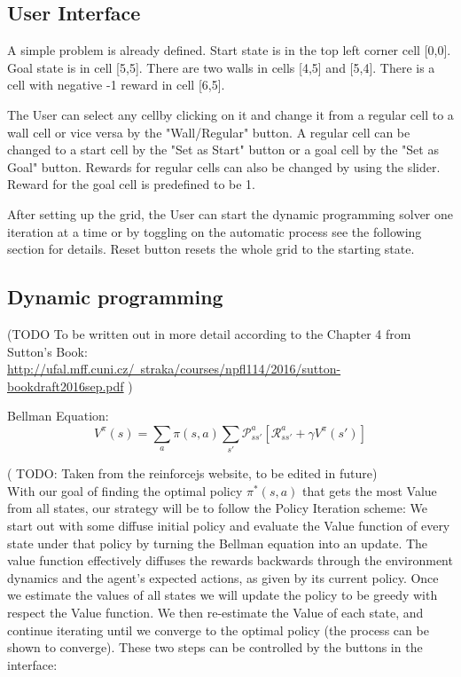 \documentclass{article}
\begin{document}
\subsection{User Interface}
A simple problem is already defined. Start state is in the top left corner cell [0,0]. Goal state is in cell [5,5]. There are two walls in cells [4,5] and [5,4]. There is a cell with negative -1 reward in cell [6,5].

The User can select any cellby clicking on it and change it from a regular cell to a wall cell or vice versa by the "Wall/Regular" button. A regular cell can be changed to a start cell by the "Set as Start" button or a goal cell by the "Set as Goal" button. Rewards for regular cells can also be changed by using the slider. Reward for the goal cell is predefined to be 1.

After setting up the grid, the User can start the dynamic programming solver one iteration at a time or by toggling on the automatic process see the following section for details. Reset button resets the whole grid to the starting state.

\subsection{Dynamic programming}
(TODO To be written out in more detail according to the Chapter 4 from Sutton's Book:\\ \href{url}{http://ufal.mff.cuni.cz/~straka/courses/npfl114/2016/sutton-bookdraft2016sep.pdf} )

Bellman Equation:
\[V^\pi(s) = \sum_{a} \pi(s,a) \sum_{s'} \mathcal{P}_{ss'}^{a} \left[ \mathcal{R}_{ss'}^{a} + \gamma V^\pi(s') \right]\]

( TODO: Taken from the reinforcejs website, to be edited in future)\\
With our goal of finding the optimal policy $\pi^*(s,a)$ that gets the most Value from all states, our strategy will be to follow the Policy Iteration scheme: We start out with some diffuse initial policy and evaluate the Value function of every state under that policy by turning the Bellman equation into an update. The value function effectively diffuses the rewards backwards through the environment dynamics and the agent's expected actions, as given by its current policy. Once we estimate the values of all states we will update the policy to be greedy with respect the Value function. We then re-estimate the Value of each state, and continue iterating until we converge to the optimal policy (the process can be shown to converge). These two steps can be controlled by the buttons in the interface:
\end{document}
